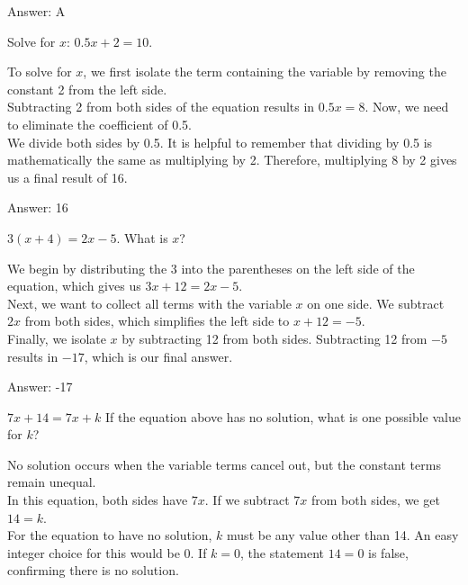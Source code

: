 \documentclass[11pt,paper=a4,answers]{exam}
\begin{document}
\begin{questions}
\begin{solution}
\vspace{15pt}
Answer: \colorbox{yellow!100}{A}
\end{solution}

\question
Solve for $x$: $0.5x + 2 = 10$.

\begin{solution}
To solve for $x$, we first isolate the term containing the variable by removing the constant 2 from the left side. 
\\[10pt]
Subtracting 2 from both sides of the equation results in $0.5x = 8$. Now, we need to eliminate the coefficient of 0.5. 
\\[10pt]
We divide both sides by 0.5. It is helpful to remember that dividing by 0.5 is mathematically the same as multiplying by 2. Therefore, multiplying 8 by 2 gives us a final result of 16.

\vspace{15pt}
Answer: \colorbox{yellow!100}{16}
\end{solution}

\question
$3(x + 4) = 2x - 5$. What is $x$?

\begin{solution}
We begin by distributing the 3 into the parentheses on the left side of the equation, which gives us $3x + 12 = 2x - 5$. 
\\[10pt]
Next, we want to collect all terms with the variable $x$ on one side. We subtract $2x$ from both sides, which simplifies the left side to $x + 12 = -5$. 
\\[10pt]
Finally, we isolate $x$ by subtracting 12 from both sides. Subtracting 12 from $-5$ results in $-17$, which is our final answer.

\vspace{15pt}
Answer: \colorbox{yellow!100}{-17}
\end{solution}

\question
$7x + 14 = 7x + k$
If the equation above has no solution, what is one possible value for $k$?

\begin{solution}
No solution occurs when the variable terms cancel out, but the constant terms remain unequal. 
\\[10pt]
In this equation, both sides have $7x$. If we subtract $7x$ from both sides, we get $14 = k$. 
\\[10pt]
For the equation to have no solution, $k$ must be any value other than 14. An easy integer choice for this would be 0. If $k = 0$, the statement $14 = 0$ is false, confirming there is no solution.


\end{solution}
\end{questions}
\end{document}
